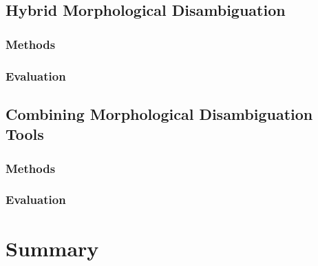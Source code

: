 \subsection{Hybrid Morphological Disambiguation}

\subsubsection{Methods}

\subsubsection{Evaluation}

\subsection{Combining Morphological Disambiguation Tools}

\subsubsection{Methods}

\subsubsection{Evaluation}

\section{Summary}